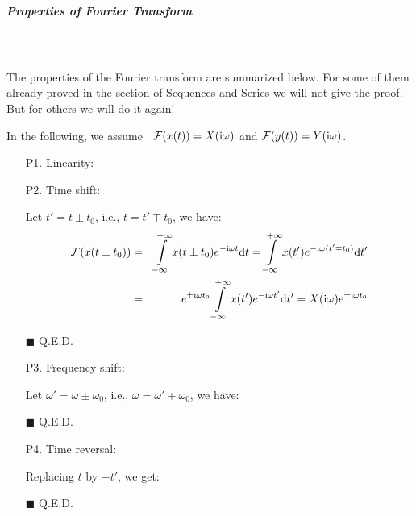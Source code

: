 	\subparagraph{Properties of Fourier Transform}\mbox{}\\\\	
	The properties of the Fourier transform are summarized below. For some of them already proved in the section of Sequences and Series we will not give the proof. But for others we will do it again! 
	
	In the following, we assume $\;\;{\cal F}(x(t))=X(\mathrm{i}\omega)$ and ${\cal F}(y(t))=Y(\mathrm{i}\omega)$.
	
	\begin{itemize}
	
	\item[P1.] Linearity:
	
	
	\item[P2.] Time shift:
	
	\begin{dem} Let $t'=t\pm t_0$, i.e., $t = t' \mp t_0$, we have:
	\begin{eqnarray}
	{\cal F}(x(t \pm t_0))&=&\int\limits_{-\infty}^{+\infty} x(t\pm t_0)
		e^{-\mathrm{i}\omega t} \mathrm{d}t
		=\int\limits_{-\infty}^{+\infty} x(t')e^{-\mathrm{i}\omega(t'\mp t_0)} \mathrm{d}t'
		\nonumber \\
		&=& e^{\pm \mathrm{i}\omega t_0}
		\int\limits_{-\infty}^{+\infty} x(t')e^{-\mathrm{i}\omega t'} \mathrm{d}t'=X(\mathrm{i}\omega)e^{\pm \mathrm{i}\omega t_0}
		\nonumber
	\end{eqnarray}
	\begin{flushright}
		$\blacksquare$  Q.E.D.
	\end{flushright}
	\end{dem}
	
	\item[P3.] Frequency shift:
	
	\begin{dem} Let $\omega'=\omega\pm \omega_0$, i.e., $\omega = \omega'\mp\omega_0$,
	we have:
	
	\begin{flushright}
		$\blacksquare$  Q.E.D.
	\end{flushright}
	\end{dem}
	
	\item[P4.] Time reversal:
	
	\begin{dem}
	
	Replacing $t$ by $-t'$, we get:
	
	\begin{flushright}
		$\blacksquare$  Q.E.D.
	\end{flushright}
	\end{dem}
	

\end{itemize}
